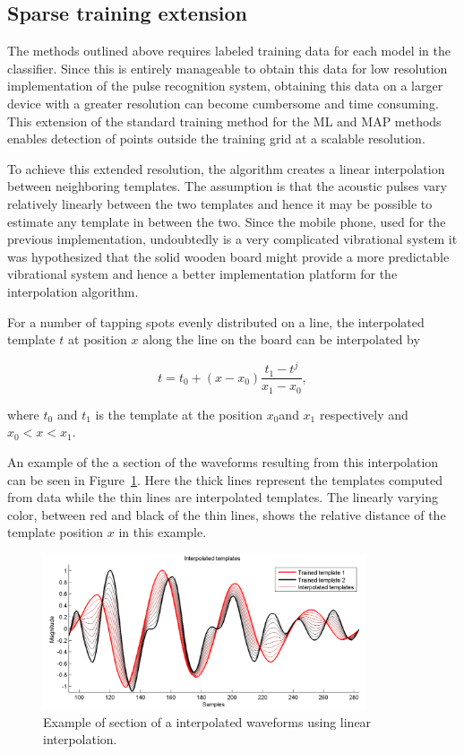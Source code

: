 \subsection{Sparse training extension}
The methods outlined above requires labeled training data for each model in the classifier. Since this is entirely manageable to obtain this data for low resolution implementation of the pulse recognition system, obtaining this data on a larger device with a greater resolution can become cumbersome and time consuming. This extension of the standard training method for the ML and MAP methods enables detection of points outside the training grid at a scalable resolution.

To achieve this extended resolution, the algorithm creates a linear interpolation between neighboring templates. The assumption is that the acoustic pulses vary relatively linearly between the two templates and hence it may be possible to estimate any template in between the two. Since the mobile phone, used for the previous implementation, undoubtedly is a very complicated vibrational system it was hypothesized that the solid wooden board might provide a more predictable vibrational system and hence a better implementation platform for the interpolation algorithm.

For a number of tapping spots evenly distributed on a line, the interpolated template $t$ at position $x$ along the line on the board can be interpolated by

\begin{equation}\label{eq:interp}
t = t_0 + \left(x - x_0\right) \frac{t_{1} - t^j}{x_1 - x_0},
\end{equation}

where $t_0$ and $t_1$ is the template at the position $x_0$and $x_1$ respectively and $x_0 < x < x_1$.

An example of the a section of the waveforms resulting from this interpolation can be seen in Figure~\ref{fig:InterpData}. Here the thick lines represent the templates computed from data while the thin lines are interpolated templates. The linearly varying color, between red and black of the thin lines, shows the relative distance of the template position $x$ in this example.

\begin{figure}[!]
\centering
\includegraphics[width=360px]{InterpData.pdf}
\caption{Example of section of a interpolated waveforms using linear interpolation.}\label{fig:InterpData}
\end{figure}

